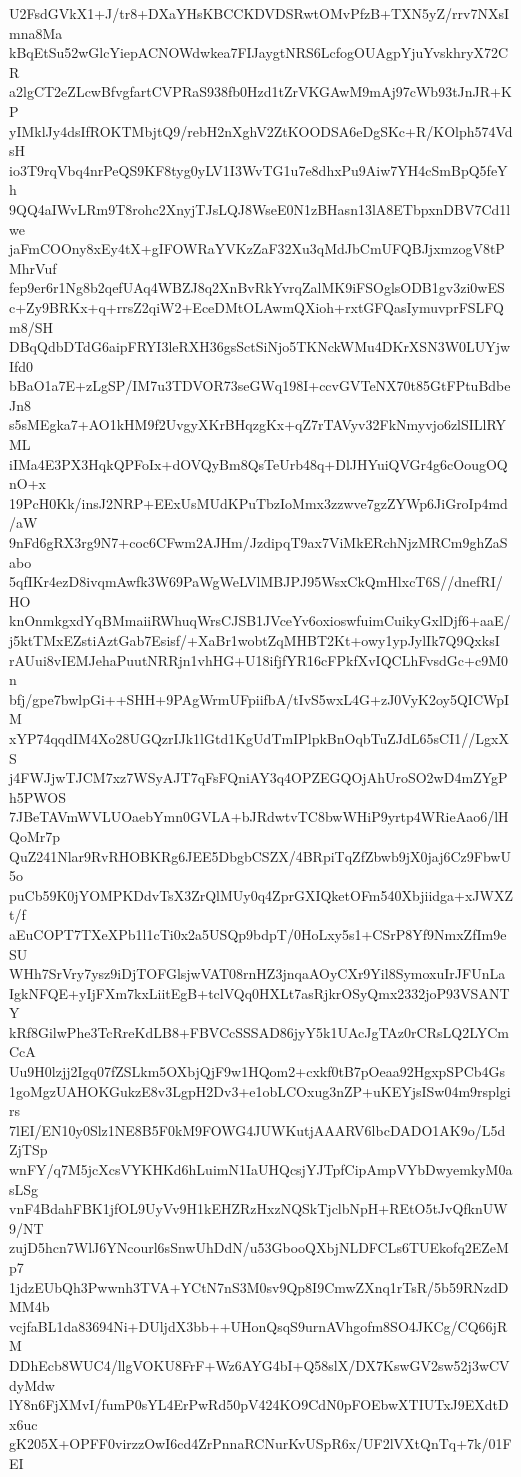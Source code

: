 U2FsdGVkX1+J/tr8+DXaYHsKBCCKDVDSRwtOMvPfzB+TXN5yZ/rrv7NXsImna8Ma
kBqEtSu52wGlcYiepACNOWdwkea7FIJaygtNRS6LcfogOUAgpYjuYvskhryX72CR
a2lgCT2eZLcwBfvgfartCVPRaS938fb0Hzd1tZrVKGAwM9mAj97cWb93tJnJR+KP
yIMklJy4dsIfROKTMbjtQ9/rebH2nXghV2ZtKOODSA6eDgSKc+R/KOlph574VdsH
io3T9rqVbq4nrPeQS9KF8tyg0yLV1I3WvTG1u7e8dhxPu9Aiw7YH4cSmBpQ5feYh
9QQ4aIWvLRm9T8rohc2XnyjTJsLQJ8WseE0N1zBHasn13lA8ETbpxnDBV7Cd1lwe
jaFmCOOny8xEy4tX+gIFOWRaYVKzZaF32Xu3qMdJbCmUFQBJjxmzogV8tPMhrVuf
fep9er6r1Ng8b2qefUAq4WBZJ8q2XnBvRkYvrqZalMK9iFSOglsODB1gv3zi0wES
c+Zy9BRKx+q+rrsZ2qiW2+EceDMtOLAwmQXioh+rxtGFQasIymuvprFSLFQm8/SH
DBqQdbDTdG6aipFRYI3leRXH36gsSctSiNjo5TKNckWMu4DKrXSN3W0LUYjwIfd0
bBaO1a7E+zLgSP/IM7u3TDVOR73seGWq198I+ccvGVTeNX70t85GtFPtuBdbeJn8
s5sMEgka7+AO1kHM9f2UvgyXKrBHqzgKx+qZ7rTAVyv32FkNmyvjo6zlSILlRYML
iIMa4E3PX3HqkQPFoIx+dOVQyBm8QsTeUrb48q+DlJHYuiQVGr4g6cOougOQnO+x
19PcH0Kk/insJ2NRP+EExUsMUdKPuTbzIoMmx3zzwve7gzZYWp6JiGroIp4md/aW
9nFd6gRX3rg9N7+coc6CFwm2AJHm/JzdipqT9ax7ViMkERchNjzMRCm9ghZaSabo
5qfIKr4ezD8ivqmAwfk3W69PaWgWeLVlMBJPJ95WsxCkQmHlxcT6S//dnefRI/HO
knOnmkgxdYqBMmaiiRWhuqWrsCJSB1JVceYv6oxioswfuimCuikyGxlDjf6+aaE/
j5ktTMxEZstiAztGab7Esisf/+XaBr1wobtZqMHBT2Kt+owy1ypJylIk7Q9QxksI
rAUui8vIEMJehaPuutNRRjn1vhHG+U18ifjfYR16cFPkfXvIQCLhFvsdGc+c9M0n
bfj/gpe7bwlpGi++SHH+9PAgWrmUFpiifbA/tIvS5wxL4G+zJ0VyK2oy5QICWpIM
xYP74qqdIM4Xo28UGQzrIJk1lGtd1KgUdTmIPlpkBnOqbTuZJdL65sCI1//LgxXS
j4FWJjwTJCM7xz7WSyAJT7qFsFQniAY3q4OPZEGQOjAhUroSO2wD4mZYgPh5PWOS
7JBeTAVmWVLUOaebYmn0GVLA+bJRdwtvTC8bwWHiP9yrtp4WRieAao6/lHQoMr7p
QuZ241Nlar9RvRHOBKRg6JEE5DbgbCSZX/4BRpiTqZfZbwb9jX0jaj6Cz9FbwU5o
puCb59K0jYOMPKDdvTsX3ZrQlMUy0q4ZprGXIQketOFm540Xbjiidga+xJWXZt/f
aEuCOPT7TXeXPb1l1cTi0x2a5USQp9bdpT/0HoLxy5s1+CSrP8Yf9NmxZfIm9eSU
WHh7SrVry7ysz9iDjTOFGlsjwVAT08rnHZ3jnqaAOyCXr9Yil8SymoxuIrJFUnLa
IgkNFQE+yIjFXm7kxLiitEgB+tclVQq0HXLt7asRjkrOSyQmx2332joP93VSANTY
kRf8GilwPhe3TcRreKdLB8+FBVCcSSSAD86jyY5k1UAcJgTAz0rCRsLQ2LYCmCcA
Uu9H0lzjj2Igq07fZSLkm5OXbjQjF9w1HQom2+cxkf0tB7pOeaa92HgxpSPCb4Gs
1goMgzUAHOKGukzE8v3LgpH2Dv3+e1obLCOxug3nZP+uKEYjsISw04m9rsplgirs
7lEI/EN10y0Slz1NE8B5F0kM9FOWG4JUWKutjAAARV6lbcDADO1AK9o/L5dZjTSp
wnFY/q7M5jcXcsVYKHKd6hLuimN1IaUHQcsjYJTpfCipAmpVYbDwyemkyM0asLSg
vnF4BdahFBK1jfOL9UyVv9H1kEHZRzHxzNQSkTjclbNpH+REtO5tJvQfknUW9/NT
zujD5hcn7WlJ6YNcourl6sSnwUhDdN/u53GbooQXbjNLDFCLs6TUEkofq2EZeMp7
1jdzEUbQh3Pwwnh3TVA+YCtN7nS3M0sv9Qp8I9CmwZXnq1rTsR/5b59RNzdDMM4b
vcjfaBL1da83694Ni+DUljdX3bb++UHonQsqS9urnAVhgofm8SO4JKCg/CQ66jRM
DDhEcb8WUC4/llgVOKU8FrF+Wz6AYG4bI+Q58slX/DX7KswGV2sw52j3wCVdyMdw
lY8n6FjXMvI/fumP0sYL4ErPwRd50pV424KO9CdN0pFOEbwXTIUTxJ9EXdtDx6uc
gK205X+OPFF0virzzOwI6cd4ZrPnnaRCNurKvUSpR6x/UF2lVXtQnTq+7k/01FEI
